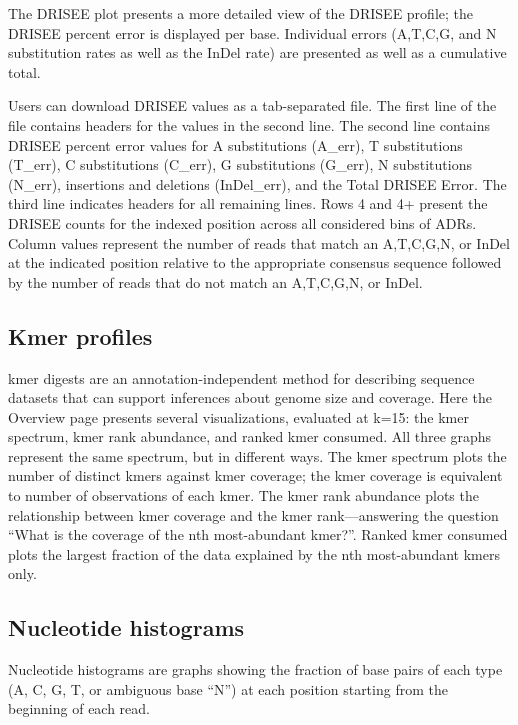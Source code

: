 \documentclass[12pt,fullpage]{report}
\begin{document}
The DRISEE plot presents a more detailed view of the DRISEE profile; the DRISEE percent error is displayed per base. Individual errors (A,T,C,G, and N substitution rates as well as the InDel rate) are presented as well as a cumulative total.

Users can download DRISEE values as a tab-separated file. The first line of the file contains headers for the values in the second line. The second line contains DRISEE percent error values for A substitutions (A\_err), T substitutions (T\_err), C substitutions (C\_err), G substitutions (G\_err), N substitutions (N\_err), insertions and deletions (InDel\_err), and the Total DRISEE Error. The third line indicates headers for all remaining lines. Rows 4 and 4+ present the DRISEE counts for the indexed position across all considered bins of ADRs. Column values represent the number of reads that match an A,T,C,G,N, or InDel at the indicated position relative to the appropriate consensus sequence followed by the number of reads that do not match an A,T,C,G,N, or InDel.
\subsection{Kmer profiles}

kmer digests are an annotation-independent method for describing sequence datasets that can support inferences about genome size and coverage. Here the Overview page presents several visualizations, evaluated at k=15:
the kmer spectrum, kmer rank abundance, and ranked kmer consumed. All three graphs represent the same spectrum, but in different ways. The kmer spectrum plots the number of distinct kmers against kmer coverage; the kmer coverage is equivalent to number of observations of each kmer. The kmer rank abundance plots the relationship between kmer coverage and the kmer rank---answering the question ``What is the coverage of the nth most-abundant kmer?''. Ranked kmer consumed plots the largest fraction of the data explained by the nth most-abundant kmers only.

\subsection{Nucleotide histograms}

Nucleotide histograms are graphs showing the fraction of base pairs of each type (A, C, G, T, or ambiguous base ``N'') at each position starting from the beginning of each read.
\end{document}
